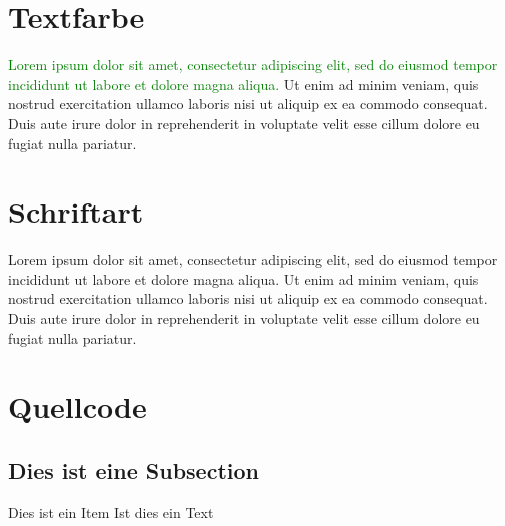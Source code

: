 \documentclass[50pt, a4paper]{article}
\begin{document}
\section{Textfarbe}


\textcolor{green}{Lorem ipsum dolor sit amet, consectetur adipiscing elit, sed do eiusmod tempor incididunt ut labore et dolore magna aliqua.}
\textcolor{pinguin}{Ut enim ad minim veniam, quis nostrud exercitation ullamco laboris nisi ut aliquip ex ea commodo consequat. Duis aute irure dolor in reprehenderit in voluptate velit esse cillum dolore eu fugiat nulla pariatur.}

\section{Schriftart}



\textcolor{leopard}{Lorem ipsum dolor sit amet, consectetur adipiscing elit, sed do eiusmod tempor incididunt ut labore et dolore magna aliqua.}  Ut enim ad minim veniam, quis nostrud exercitation ullamco laboris nisi ut aliquip ex ea commodo consequat. Duis aute irure dolor in reprehenderit in voluptate velit esse cillum dolore eu fugiat nulla pariatur.


\section{Quellcode}


\begin{description}
\subsection{Dies ist eine Subsection}
\item{Dies ist ein Item} Ist dies ein Text
\end{description}
\end{document}
